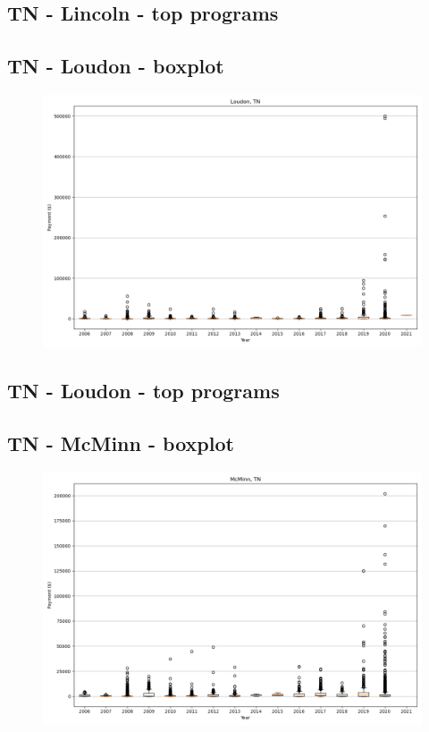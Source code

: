 \subsection*{TN - Lincoln - top programs}

\newpage
\subsection*{TN - Loudon - boxplot}
\begin{figure}[h]
\centering
\includegraphics[width=7in]{../output/boxplots/counties/Loudon-TN_boxplot.png}
\end{figure}


\subsection*{TN - Loudon - top programs}

\newpage
\subsection*{TN - McMinn - boxplot}
\begin{figure}[h]
\centering
\includegraphics[width=7in]{../output/boxplots/counties/McMinn-TN_boxplot.png}
\end{figure}


